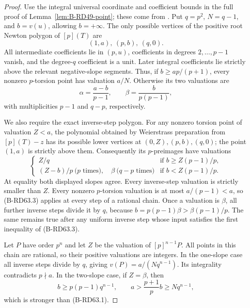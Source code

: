 \begin{proof}
Use the integral universal coordinate and coefficient bounds in
the full proof of Lemma~\ref{lem:B-RD49-point}; these come from
\cite[Proposition~5.7; (12.3)--(12.5); Proposition~12.10 and proof]
{HopkinsGross1994Bundles}. Put $q=p^2$, $N=q-1$, and $b=v(u)$,
allowing $b=+\infty$. The only possible vertices of the positive
root Newton polygon of $[p](T)$ are
\[
                         (1,a),\ (p,b),\ (q,0).
\]
All intermediate coefficients lie in $(p,u)$, coefficients in
degrees $2,\ldots,p-1$ vanish, and the degree-$q$ coefficient is a
unit. Later integral coefficients lie strictly above the relevant
negative-slope segments. Thus, if $b\ge ap/(p+1)$, every nonzero
$p$-torsion point has valuation $a/N$. Otherwise its two valuations
are
\[
       \alpha=\frac{a-b}{p-1},\qquad
       \beta=\frac{b}{p(p-1)},                           \tag{B-RD63.2}
\]
with multiplicities $p-1$ and $q-p$, respectively.

We also require the exact inverse-step polygon. For any nonzero
torsion point of valuation $Z<a$, the polynomial obtained by
Weierstrass preparation from $[p](T)-z$ has its possible lower
vertices at $(0,Z),(p,b),(q,0)$; the point $(1,a)$ is strictly
above them. Consequently its $p$-preimages have valuations
\[
 \begin{cases}
 Z/q &\text{if } b\ge Z(p-1)/p,\\
 (Z-b)/p\ \text{($p$ times)},\quad
 \beta\ \text{($q-p$ times)}&\text{if }b<Z(p-1)/p.
 \end{cases}                                           \tag{B-RD63.3}
\]
At equality both displayed slopes agree. Every inverse-step
valuation is strictly smaller than $Z$. Every nonzero $p$-torsion
valuation is at most $a/(p-1)<a$, so (B-RD63.3) applies at every
step of a rational chain. Once a valuation is $\beta$, all further
inverse steps divide it by $q$, because
$b=p(p-1)\beta>\beta(p-1)/p$. The same remains true after any
uniform inverse step whose input satisfies the first inequality
of (B-RD63.3).

Let $P$ have order $p^n$ and let $Z$ be the valuation of
$[p]^{n-1}P$. All points in this chain are rational, so their
positive valuations are integers. In the one-slope case all
inverse steps divide by $q$, giving
$v(P)=a/(Nq^{n-1})$. Its integrality contradicts $p\nmid a$.
In the two-slope case, if $Z=\beta$, then
\[
 b\ge p(p-1)q^{n-1},\qquad
 a>\frac{p+1}{p}b\ge Nq^{n-1},
\]
which is stronger than (B-RD63.1).


\end{proof}
